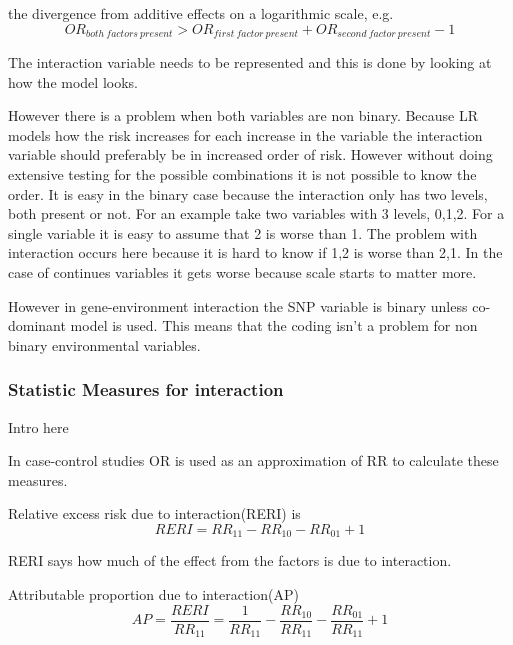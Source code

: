 \documentclass[10pt,a4paper]{report}
\begin{document}
the divergence from additive effects on a logarithmic scale, e.g.
\begin{equation}
OR_{both\:factors\:present}>OR_{first\:factor\:present}+OR_{second\:factor\:present}-1
\end{equation}
\cite{rothman1998modern}

The interaction variable needs to be represented and this is done by looking at how the model looks.



However there is a problem when both variables are non binary. Because LR models how the risk increases for each increase in the variable the interaction variable should preferably be in increased order of risk. However without doing extensive testing for the possible combinations it is not possible to know the order. It is easy in the binary case because the interaction only has two levels, both present or not. For an example take two variables with 3 levels, 0,1,2. For a single variable it is easy to assume that 2 is worse than 1. The problem with interaction occurs here because it is hard to know if 1,2 is worse than 2,1. In the case of continues variables it gets worse because scale starts to matter more.

However in gene-environment interaction the SNP variable is binary unless co-dominant model is used. This means that the coding isn't a problem for non binary environmental variables.

\subsubsection{Statistic Measures for interaction}
Intro here

In case-control studies OR is used as an approximation of RR to calculate these measures.

Relative  excess risk due to interaction(RERI) is
\begin{equation}
RERI=RR_{11}-RR_{10}-RR_{01}+1
\end{equation}

RERI says how much of the effect from the factors is due to interaction.

Attributable proportion due to interaction(AP)
\begin{equation}
AP=\frac{RERI}{RR_{11}}=\frac{1}{RR_{11}}-\frac{RR_{10}}{RR_{11}}-\frac{RR_{01}}{RR_{11}}+1
\end{equation}
\end{document}
